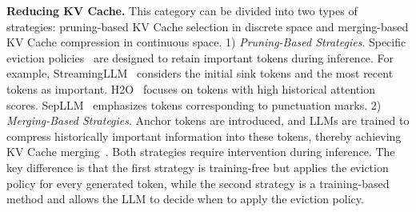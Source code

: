 \textbf{Reducing KV Cache.}
This category can be divided into two types of strategies: pruning-based KV Cache selection in discrete space and merging-based KV Cache compression in continuous space.
1) \textit{Pruning-Based Strategies}.
Specific eviction policies~\citep{nips23_h2o, iclr24_streamingllm,arxiv24_sepllm,arxiv24_scope} are designed to retain important tokens during inference.
For example, StreamingLLM~\citep{iclr24_streamingllm} considers the initial sink tokens and the most recent tokens as important.
H2O~\citep{nips23_h2o} focuses on tokens with high historical attention scores.
SepLLM~\citep{arxiv24_sepllm} emphasizes tokens corresponding to punctuation marks.
2) \textit{Merging-Based Strategies}.
Anchor tokens are introduced, and LLMs are trained to compress historically important information into these tokens, thereby achieving KV Cache merging~\citep{acl24_anllm}.
Both strategies require intervention during inference. 
The key difference is that the first strategy is training-free but applies the eviction policy for every generated token, while the second strategy is a training-based method and allows the LLM to decide when to apply the eviction policy.
